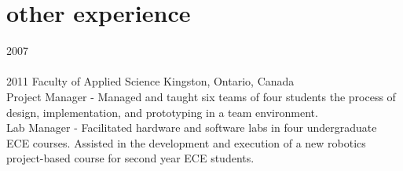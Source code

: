 
\section{other experience}
\begin{entrylist}
\entry
  {2007\\\faChevronDown\\2011}
  {Faculty of Applied Science}
  {Kingston, Ontario, Canada}
  {\\
  {\headingfont Project Manager} - Managed and taught six teams of four students the process of design, implementation, and prototyping in a team environment.\\
  {\headingfont Lab Manager} - Facilitated hardware and software labs in four undergraduate ECE courses. Assisted in the development and execution of a new robotics project-based course for second year ECE students.}
\end{entrylist}